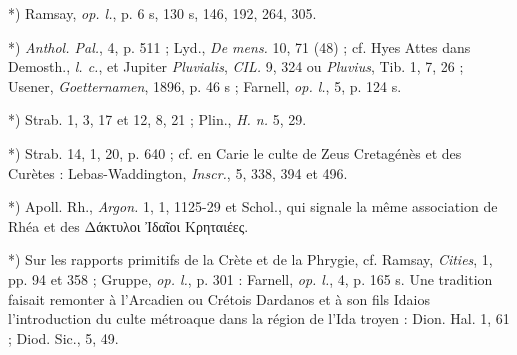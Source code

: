 \documentclass[a4paper, 11pt, oneside, polutonikogreek, french]{article}
\begin{document}
*) Ramsay, \emph{op. l.}, p. 6 s, 130 s, 146, 192, 264, 305.

*) \emph{Anthol. Pal.}, 4, p. 511 ; Lyd., \emph{De mens.} 10, 71 (48) ; cf. Hyes Attes dans Demosth., \emph{l. c.}, et Jupiter \emph{Pluvialis}, \emph{CIL.} 9, 324 ou \emph{Pluvius}, Tib. 1, 7, 26 ; Usener, \emph{Goetternamen}, 1896, p. 46 s ; Farnell, \emph{op. l.}, 5, p. 124 s.

*) Strab. 1, 3, 17 et 12, 8, 21 ; Plin., \emph{H. n.} 5, 29.

*) Strab. 14, 1, 20, p. 640 ; cf. en Carie le culte de Zeus Cretagénès et des Curètes : Lebas-Waddington, \emph{Inscr.}, 5, 338, 394 et 496.

*) Apoll. Rh., \emph{Argon.} 1, 1, 1125-29 et Schol., qui signale la même association de Rhéa et des Δάκτυλοι Ἰδαῖοι Κρηταιέες.

*) Sur les rapports primitifs de la Crète et de la Phrygie, cf. Ramsay, \emph{Cities}, 1, pp. 94 et 358 ; Gruppe, \emph{op. l.}, p. 301 : Farnell, \emph{op. l.}, 4, p. 165 s. Une tradition faisait remonter à l'Arcadien ou Crétois Dardanos et à son fils Idaios l'introduction du culte métroaque dans la région de l'Ida troyen : Dion. Hal. 1, 61 ; Diod. Sic., 5, 49.
\end{document}
